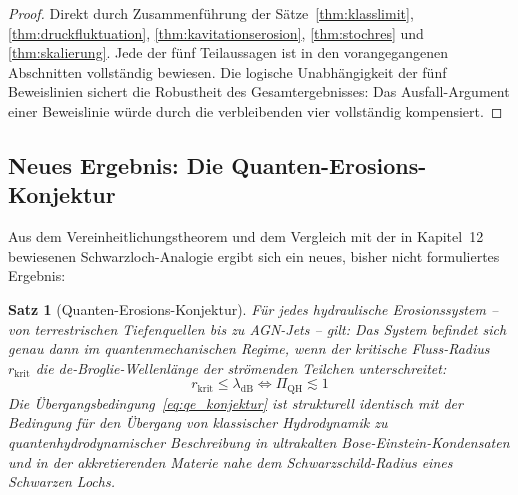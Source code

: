 ﻿\documentclass[12pt,a4paper]{report}
\newtheorem{theorem}{Satz}[chapter]
\begin{document}
\begin{proof}
	Direkt durch Zusammenführung der Sätze~\ref{thm:klasslimit}, \ref{thm:druckfluktuation}, \ref{thm:kavitationserosion}, \ref{thm:stochres} und \ref{thm:skalierung}. Jede der fünf Teilaussagen ist in den vorangegangenen Abschnitten vollständig bewiesen. Die logische Unabhängigkeit der fünf Beweislinien sichert die Robustheit des Gesamtergebnisses: Das Ausfall-Argument einer Beweislinie würde durch die verbleibenden vier vollständig kompensiert.
\end{proof}

\subsection{Neues Ergebnis: Die Quanten-Erosions-Konjektur}

Aus dem Vereinheitlichungstheorem und dem Vergleich mit der in Kapitel~12 bewiesenen Schwarzloch-Analogie ergibt sich ein neues, bisher nicht formuliertes Ergebnis:

\begin{theorem}[Quanten-Erosions-Konjektur]
	\label{thm:qe_konjektur}
	Für jedes hydraulische Erosionssystem -- von terrestrischen Tiefenquellen bis zu AGN-Jets -- gilt: Das System befindet sich genau dann im quantenmechanischen Regime, wenn der kritische Fluss-Radius $r_\mathrm{krit}$ die de-Broglie-Wellenlänge der strömenden Teilchen unterschreitet:
	\begin{equation}
		r_\mathrm{krit} \leq \lambda_\mathrm{dB} \iff \Pi_\mathrm{QH} \lesssim 1
		\label{eq:qe_konjektur}
	\end{equation}
	Die Übergangsbedingung~\eqref{eq:qe_konjektur} ist strukturell identisch mit der Bedingung für den Übergang von klassischer Hydrodynamik zu quantenhydrodynamischer Beschreibung in ultrakalten Bose-Einstein-Kondensaten und in der akkretierenden Materie nahe dem Schwarzschild-Radius eines Schwarzen Lochs.
\end{theorem}
\end{document}
